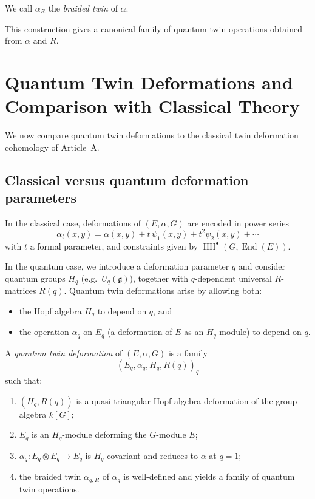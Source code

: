 \documentclass[11pt,a4paper]{article}
\numberwithin{equation}{section}
\DeclareMathOperator{\End}{End}
\DeclareMathOperator{\HH}{HH}
\newcommand{\TwinSpace}{(E,\alpha,G)}
\begin{document}
	\begin{definition}
		We call $\alpha_R$ the \emph{braided twin} of $\alpha$.
	\end{definition}
	
	This construction gives a canonical family of quantum twin operations obtained from $\alpha$ and $R$.
	
	\section{Quantum Twin Deformations and Comparison with Classical Theory}
	\label{sec:quantum-def}
	
	We now compare quantum twin deformations to the classical twin deformation cohomology of Article~A.
	
	\subsection{Classical versus quantum deformation parameters}
	
	In the classical case, deformations of $\TwinSpace$ are encoded in power series
	\[
	\alpha_t(x,y) = \alpha(x,y) + t\,\psi_1(x,y) + t^2\psi_2(x,y) + \cdots
	\]
	with $t$ a formal parameter, and constraints given by $\HH^\bullet(G,\End(E))$.
	
	In the quantum case, we introduce a deformation parameter $q$ and consider quantum groups
	$H_q$ (e.g.\ $U_q(\mathfrak{g})$), together with $q$-dependent universal $R$-matrices $R(q)$.
	Quantum twin deformations arise by allowing both:
	\begin{itemize}
		\item the Hopf algebra $H_q$ to depend on $q$, and
		\item the operation $\alpha_q$ on $E_q$ (a deformation of $E$ as an $H_q$-module) to depend on $q$.
	\end{itemize}
	
	\begin{definition}
		A \emph{quantum twin deformation} of $\TwinSpace$ is a family
		\[
		(E_q,\alpha_q,H_q,R(q))_{q}
		\]
		such that:
		\begin{enumerate}[label=(\alph*)]
			\item $(H_q,R(q))$ is a quasi-triangular Hopf algebra deformation of the group algebra $k[G]$;
			\item $E_q$ is an $H_q$-module deforming the $G$-module $E$;
			\item $\alpha_q:E_q\otimes E_q\to E_q$ is $H_q$-covariant and reduces to $\alpha$ at $q=1$;
			\item the braided twin $\alpha_{q,R}$ of $\alpha_q$ is well-defined and yields a family of quantum twin operations.
		\end{enumerate}
	\end{definition}
	
\end{document}
